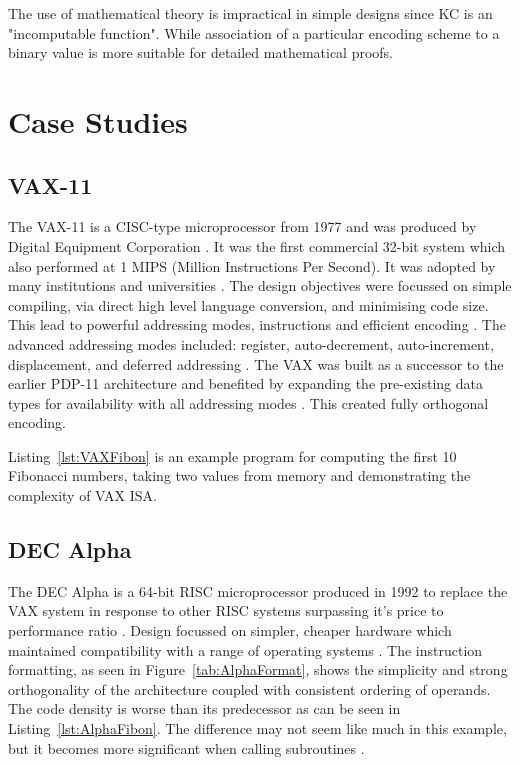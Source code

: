 \documentclass[12pt,a4paper]{article}
\begin{document}
The use of mathematical theory is impractical in simple designs since KC is an "incomputable function"\cite{Density:Kolmo}. While association of a particular encoding scheme to a binary value is more suitable for detailed mathematical proofs.

\section{Case Studies}

\subsection{VAX-11}
The VAX-11 is a CISC-type microprocessor from 1977 and was produced by Digital Equipment Corporation \cite{VAX:History}. It was the first commercial 32-bit system which also performed at 1 MIPS (Million Instructions Per Second). It was adopted by many institutions and universities \cite{VAX:History}. The design objectives were focussed on simple compiling, via direct high level language conversion, and minimising code size. This lead to powerful addressing modes, instructions and efficient encoding \cite{VAX:Chap3}. The advanced addressing modes included: register, auto-decrement, auto-increment, displacement, and deferred addressing \cite{VAX:ArchRefMan}. The VAX was built as a successor to the earlier PDP-11 architecture and benefited by expanding the pre-existing data types for availability with all addressing modes \cite{wiki:OrthogonalIS}. This created fully orthogonal encoding. 

Listing~\ref{lst:VAXFibon} is an example program for computing the first 10 Fibonacci numbers, taking two values from memory and demonstrating the complexity of VAX ISA.

\newpage


\subsection{DEC Alpha}
The DEC Alpha is a 64-bit RISC microprocessor produced in 1992 to replace the VAX system in response to other RISC systems surpassing it's price to performance ratio \cite{Alpha:Wiki}. Design focussed on simpler, cheaper hardware which maintained compatibility with a range of operating systems \cite{Alpha:Wiki}. The instruction formatting, as seen in Figure~\ref{tab:AlphaFormat}, shows the simplicity and strong orthogonality of the architecture coupled with consistent ordering of operands. The code density is worse than its predecessor as can be seen in Listing~\ref{lst:AlphaFibon}. The difference may not seem like much in this example, but it becomes more significant when calling subroutines \cite{VAX:Chap3}. 
\end{document}
